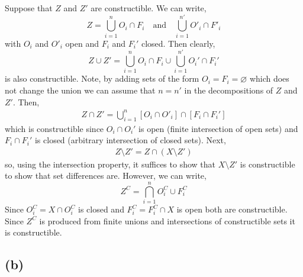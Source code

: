 \documentclass[12pt]{extarticle}
\begin{document}
Suppose that $Z$ and $Z'$ are constructible. We can write,
\[Z = \bigcup_{i = 1}^n O_i \cap F_i \quad \text{and} \quad \bigcup_{i = 1}^{n'} O'_i \cap F'_i \]
with $O_i$ and $O'_i$ open and $F_i$ and $F_i'$ closed. Then clearly,
\[ Z \cup Z' = \bigcup_{i = 1}^n O_i \cap F_i \cup \bigcup_{i = 1}^{n'} O_i' \cap F_i' \]
is also constructible. Note, by adding sets of the form $O_i = F_i = \varnothing$ which does not change the union we can assume that $n = n'$ in the decompositions of $Z$ and $Z'$. Then,
\begin{align*}
Z \cap Z' = \bigcup_{i = 1}^n [O_i \cap O'_i] \cap [F_i \cap F_i']
\end{align*}
which is constructible since $O_i \cap O_i'$ is open (finite intersection of open sets) and $F_i \cap F_i'$ is closed (arbitrary intersection of closed sets). Next,
\begin{align*}
Z \setminus Z' = Z \cap (X \setminus Z')
\end{align*}
so, using the intersection property, it suffices to show that $X \setminus Z'$ is constructible to show that set differences are. However, we can write,
\[ Z^C = \bigcap_{i = 1}^n O_i^C \cup F_i^C \]
Since $O_i^C = X \cap O_i^C$ is closed and $F_i^C = F_i^C \cap X$ is open both are constructible. Since $Z^C$ is produced from finite unions and intersections of constructible sets it is constructible. 

\subsection*{(b)}
\end{document}
